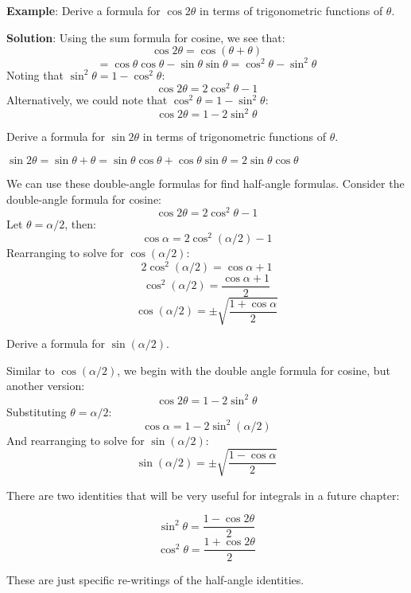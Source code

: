 \textbf{Example}: Derive a formula for $\cos{2\theta}$ in terms of 
trigonometric functions of $\theta$.

\textbf{Solution}: Using the sum formula for cosine, we see that:
$$\cos{2\theta} = \cos{\left( \theta + \theta \right)}$$
$$= \cos{\theta}\cos{\theta} - \sin{\theta}\sin{\theta} = \cos^2{\theta} - 
\sin^2{\theta}$$
Noting that $\sin^2{\theta} = 1 - \cos^2{\theta}$:
$$\cos{2\theta} = 2\cos^2{\theta} - 1$$
Alternatively, we could note that $\cos^2{\theta} = 1 - \sin^2{\theta}$:
$$\cos{2\theta} = 1 - 2\sin^2{\theta}$$

\begin{Exercise}[label = double_sine]
Derive a formula for $\sin{2\theta}$ in terms of trigonometric functions of 
$\theta$.
\vspace{50mm}
\end{Exercise}

\begin{Answer}[ref = double_sine]
$\sin{2\theta} = \sin{\theta + \theta} = \sin{\theta}\cos{\theta} + \cos{
\theta}\sin{\theta} = 2\sin{\theta}\cos{\theta}$
\end{Answer}

We can use these double-angle formulas for find half-angle formulas. Consider 
the double-angle formula for cosine:
$$\cos{2\theta} = 2\cos^2{\theta} - 1$$
Let $\theta = \alpha / 2$, then:
$$\cos{\alpha} = 2\cos^2{ \left( \alpha / 2 \right) } - 1$$
Rearranging to solve for $\cos{ \left( \alpha / 2 \right) }$:
$$2\cos^2{ \left( \alpha / 2 \right) } = \cos{\alpha} + 1$$
$$\cos^2{ \left( \alpha / 2 \right)} = \frac{\cos{\alpha} + 1}{2}$$
$$\cos{ \left( \alpha / 2 \right)} = \pm \sqrt{\frac{1 + \cos{\alpha}}{2}}$$

\begin{Exercise}[label = half_sine]
Derive a formula for $\sin{ \left( \alpha / 2 \right)}$.
\vspace{75mm}
\end{Exercise}

\begin{Answer}[ref = half_sine]
Similar to $\cos{ \left( \alpha / 2 \right)}$, we begin with the double angle 
formula for cosine, but another version:
$$\cos{2\theta} = 1 - 2\sin^2{\theta}$$
Substituting $\theta = \alpha / 2$:
$$\cos{\alpha} = 1 - 2\sin^2{ \left( \alpha / 2 \right)}$$
And rearranging to solve for $\sin{ \left( \alpha / 2 \right) }$:
$$\sin{ \left( \alpha / 2 \right) } = \pm \sqrt{\frac{1 - \cos{\alpha}}{2}}$$
\end{Answer}

There are two identities that will be very useful for integrals in a future 
chapter:
\begin{mdframed}[style=important, frametitle={Squared Trigonometric 
Identities}]
$$\sin^2{\theta} = \frac{1 - \cos{2\theta}}{2}$$
$$\cos^2{\theta} = \frac{1 + \cos{2\theta}}{2}$$
\end{mdframed}

These are just specific re-writings of the half-angle identities. 